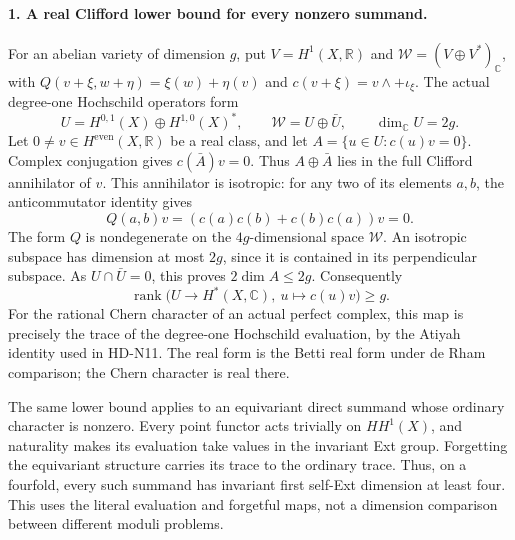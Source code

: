 \paragraph{1. A real Clifford lower bound for every nonzero summand.}
For an abelian variety of dimension $g$, put
$V=H^1(X,\mathbb R)$ and $\mathcal W=(V\oplus V^*)_{\mathbb C}$,
with $Q(v+\xi,w+\eta)=\xi(w)+\eta(v)$ and
$c(v+\xi)=v\wedge+\iota_\xi$. The actual degree-one Hochschild
operators form
\[
 U=H^{0,1}(X)\oplus H^{1,0}(X)^*,\qquad
 \mathcal W=U\oplus\bar U,\qquad \dim_{\mathbb C}U=2g.
\]
Let $0\ne v\in H^{\mathrm{even}}(X,\mathbb R)$ be a real class,
and let $A=\{u\in U:c(u)v=0\}$. Complex conjugation gives
$c(\bar A)v=0$. Thus $A\oplus\bar A$ lies in the full Clifford
annihilator of $v$. This annihilator is isotropic: for any two of
its elements $a,b$, the anticommutator identity gives
\[
              Q(a,b)v=(c(a)c(b)+c(b)c(a))v=0.
\]
The form $Q$ is nondegenerate on the $4g$-dimensional space
$\mathcal W$. An isotropic subspace has dimension at most $2g$,
since it is contained in its perpendicular subspace. As
$U\cap\bar U=0$, this proves $2\dim A\le2g$. Consequently
\[
       \operatorname{rank}\bigl(U\longrightarrow H^*(X,\mathbb C),
                          \ u\longmapsto c(u)v\bigr)\ge g.       \tag{R04.3}
\]
For the rational Chern character of an actual perfect complex, this
map is precisely the trace of the degree-one Hochschild evaluation,
by the Atiyah identity used in HD-N11. The real form is the Betti
real form under de Rham comparison; the Chern character is real there.

The same lower bound applies to an equivariant direct summand whose
ordinary character is nonzero. Every point functor acts trivially on
$HH^1(X)$, and naturality makes its evaluation take values in the
invariant Ext group. Forgetting the equivariant structure carries its
trace to the ordinary trace. Thus, on a fourfold, every such summand
has invariant first self-Ext dimension at least four. This uses the
literal evaluation and forgetful maps, not a dimension comparison
between different moduli problems.

